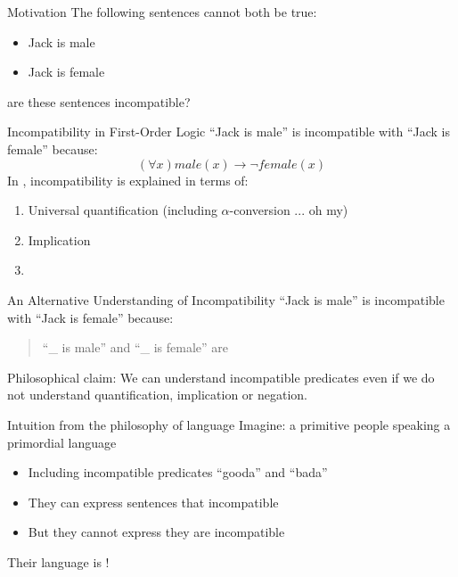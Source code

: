 \begin{frame}{Motivation}
The following sentences cannot both be true:
\begin{itemize}
\item
Jack is male
\item
Jack is female
\end{itemize}
 are these sentences incompatible?
\end{frame}

\begin{frame}{Incompatibility in First-Order Logic}
``Jack is male'' is incompatible with ``Jack is female'' because:
\[
(\forall x) male(x) \rightarrow \neg female(x)
\]
In \fol{}, incompatibility is explained in terms of:
\begin{enumerate}
\item
Universal quantification (including $\alpha$-conversion ... oh my)
\item
Implication
\item


\end{enumerate}
\end{frame}


\begin{frame}{An Alternative Understanding of Incompatibility}
``Jack is male'' is incompatible with ``Jack is female'' because:
\begin{quote}
``\_ is male'' and ``\_ is female'' are 
\end{quote}
Philosophical claim: We can understand incompatible predicates even if
we do not understand quantification, implication or negation.
\end{frame}

\begin{frame}{Intuition from the philosophy of language}
  \pause
  Imagine: a primitive people speaking a primordial language
  \VSPACE
\begin{itemize}

\pause\item Including incompatible predicates ``gooda'' and ``bada''
\pause\item They can express sentences that  incompatible
\pause\item But they cannot express  they are incompatible
\end{itemize}

\VSPACE
Their language is !


\end{frame}

